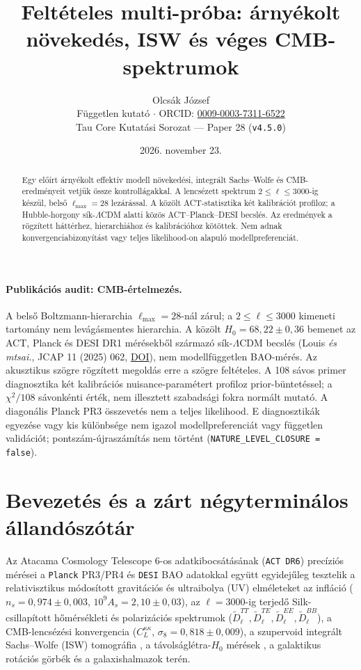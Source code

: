\documentclass[11pt,a4paper]{article}
\title{Feltételes multi-próba: árnyékolt növekedés, ISW és véges CMB-spektrumok}
\author{Olcsák József \\ \small Független kutató $\cdot$ ORCID: \href{https://orcid.org/0009-0003-7311-6522}{0009-0003-7311-6522} \\ \small Tau Core Kutatási Sorozat --- Paper 28 (\texttt{v4.5.0})}
\date{2026. november 23.}
\begin{document}
\maketitle

\begin{abstract}
Egy előírt árnyékolt effektív modell növekedési, integrált Sachs--Wolfe és CMB-eredményeit vetjük össze kontrollágakkal. A lencsézett spektrum $2\le\ell\le3000$-ig készül, belső $\ell_{\max}=28$ lezárással. A közölt ACT-statisztika két kalibrációt profiloz; a Hubble-horgony sík-$\Lambda$CDM alatti közös ACT--Planck--DESI becslés. Az eredmények a rögzített háttérhez, hierarchiához és kalibrációhoz kötöttek. Nem adnak konvergenciabizonyítást vagy teljes likelihood-on alapuló modellpreferenciát.
\end{abstract}

\paragraph{Publikációs audit: CMB-értelmezés.}
A belső Boltzmann-hierarchia $\ell_{\max}=28$-nál zárul; a $2\leq\ell\leq3000$ kimeneti tartomány nem levágásmentes hierarchia. A közölt $H_0=68{,}22\pm0{,}36$ bemenet az ACT, Planck és DESI DR1 mérésekből származó sík-$\Lambda$CDM becslés (Louis \textit{és mtsai.}, JCAP 11 (2025) 062, \href{https://doi.org/10.1088/1475-7516/2025/11/062}{DOI}), nem modellfüggetlen BAO-mérés. Az akusztikus szögre rögzített megoldás erre a szögre feltételes. A 108 sávos primer diagnosztika két kalibrációs nuisance-paramétert profiloz prior-büntetéssel; a $\chi^2/108$ sávonkénti érték, nem illesztett szabadsági fokra normált mutató. A diagonális Planck PR3 összevetés nem a teljes likelihood. E diagnosztikák egyezése vagy kis különbsége nem igazol modellpreferenciát vagy független validációt; pontszám-újraszámítás nem történt (\texttt{NATURE\_LEVEL\_CLOSURE = false}).

\section{Bevezetés és a zárt négyterminálos állandószótár}
\label{sec:intro}

Az Atacama Cosmology Telescope 6-os adatkibocsátásának ({\upshape\texttt{ACT DR6}}) precíziós mérései \cite{ACTDR6_Louis2025,ACTDR6_Calabrese2025,ACTDR6_Qu2024} a \texttt{Planck} PR3/PR4 \cite{Planck2018VI,Planck2018X,Carron2022PR4Lensing} és \texttt{DESI} BAO \cite{DESI2024VI} adatokkal együtt egyidejűleg tesztelik a relativisztikus módosított gravitációs és ultraibolya (UV) elméleteket az infláció ($n_s = 0{,}974 \pm 0{,}003$, $10^9 A_s = 2{,}10 \pm 0{,}03$), az $\ell = 3000$-ig terjedő Silk-csillapított hőmérsékleti és polarizációs spektrumok ($\tilde{D}_\ell^{TT}, \tilde{D}_\ell^{TE}, \tilde{D}_\ell^{EE}, \tilde{D}_\ell^{BB}$), a CMB-lencsézési konvergencia ($C_L^{\kappa\kappa}$, $\sigma_8 = 0{,}818 \pm 0{,}009$), a szupervoid integrált Sachs--Wolfe (ISW) tomográfia \cite{Kovacs2022DESY3}, a távolságlétra-$H_0$ mérések \cite{Riess2022SH0ES,Freedman2025CCHP}, a galaktikus rotációs görbék \cite{Lelli2016SPARC} és a galaxishalmazok \cite{Eckert2019XCOP} terén.
\end{document}
